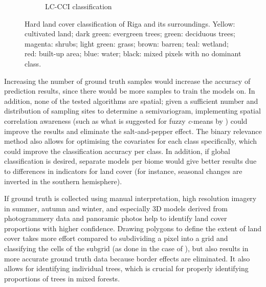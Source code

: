 \documentclass[a4paper,12pt]{scrbook}
\begin{document}
\begin{figure}
\begin{subfigure}{0.48\textwidth}
    \caption{LC-CCI classification}
  \end{subfigure}
  \caption{Hard land cover classification of Riga and its surroundings. Yellow: cultivated land; dark green: evergreen trees; green: deciduous trees; magenta: shrubs; light green: grass; brown: barren; teal: wetland; red: built-up area; blue: water; black: mixed pixels with no dominant class.}
  \label{fig-hard-rf}
\end{figure}

Increasing the number of ground truth samples would increase the accuracy of prediction results, since there would be more samples to train the models on. In addition, none of the tested algorithms are spatial; given a sufficient number and distribution of sampling sites to determine a semivariogram, implementing spatial correlation awareness (such as what is suggested for fuzzy \textit{c}-means by \citet{gong2013improvedcmeans}) could improve the results and eliminate the salt-and-pepper effect. The binary relevance method also allows for optimising the covariates for each class specifically, which could improve the classification accuracy per class. In addition, if global classification is desired, separate models per biome would give better results due to differences in indicators for land cover (for instance, seasonal changes are inverted in the southern hemisphere).

If ground truth is collected using manual interpretation, high resolution imagery in summer, autumn and winter, and especially 3D models derived from photogrammery data and panoramic photos help to identify land cover proportions with higher confidence. Drawing polygons to define the extent of land cover takes more effort compared to subdividing a pixel into a grid and classifying the cells of the subgrid (as done in the case of \citet{perger2012geowiki}), but also results in more accurate ground truth data because border effects are eliminated. It also allows for identifying individual trees, which is crucial for properly identifying proportions of trees in mixed forests.
\end{document}
